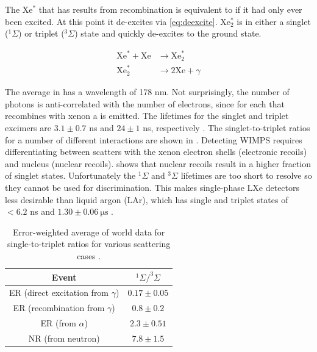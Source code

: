 The Xe$^{*}$ that has results from recombination is equivalent to if it had only ever been excited.  At this point
it de-excites via \eqref{eq:deexcite}.  Xe$_{2}^{*}$ is in either a singlet
($^{1}\Sigma$) or triplet ($^{3}\Sigma$) state and quickly de-excites to the ground state.

\begin{subequations}
\begin{align}
\mathrm{Xe}^{*} + \mathrm{Xe} &\rightarrow \mathrm{Xe}_{2}^{*} \\
\mathrm{Xe}_{2}^{*} &\rightarrow 2\mathrm{Xe} + \gamma
\label{eq:deexcite_gamma}
\end{align}
\label{eq:deexcite}
\end{subequations}

The average \gammaray in  has a wavelength of 178 nm.  Not surprisingly, the number of photons is
anti-correlated with the number of electrons, since for each \electron that
recombines with xenon a \gammaray is emitted.  The lifetimes for the singlet and triplet
excimers are $3.1 \pm 0.7$ ns and $24 \pm 1$ ns, respectively .  The singlet-to-triplet ratios for
a number of different interactions are shown in .  Detecting WIMPS requires differentiating between
scatters with the xenon electron shells (electronic recoils) and nucleus (nuclear recoils).   shows that
nuclear recoils result in a higher fraction of singlet states.  Unfortunately the $^1\Sigma$ and $^3\Sigma$ lifetimes
are too short to resolve so they cannot be used for discrimination.  This makes single-phase LXe detectors
less desirable than liquid argon (LAr), which has single and triplet states of $< 6.2$ ns and $1.30 \pm 0.06\ \mathrm{\mu s}$
.

\begin{table}[t]
 \centering
 \begin{tabular}{cc}
 \hline
 \hline
 Event & $^1\Sigma / ^3\Sigma$ \\
 \hline
 ER (direct excitation from $\gamma$) & $0.17 \pm 0.05$ \\
 ER (recombination from $\gamma$) & $0.8 \pm 0.2$ \\
 ER (from $\alpha$) & $2.3 \pm 0.51$ \\
 NR (from neutron) & $7.8 \pm 1.5$ \\
 \hline
 \hline
 \end{tabular}
 \caption{Error-weighted average of world data for single-to-triplet ratios for various scattering cases .}
\label{tab:singlet_to_triplet}
\end{table}

